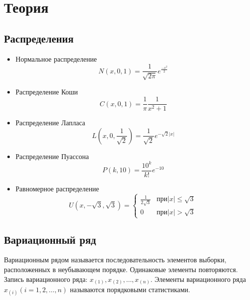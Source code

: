 \documentclass[a4paper]{article}
\begin{document}
\section {Теория}
\subsection{Распределения}
	\begin{itemize}
		\item Нормальное распределение \begin{equation}
										  N(x, 0, 1) = \frac{1}{\sqrt{2\pi}}e^{\frac{-x^2}{2}} \label{norm} 
									   \end{equation}
		\item Распределение Коши \begin{equation}
									C(x, 0, 1) = \frac{1}{\pi}\frac{1}{x^2+1} \label{koshi}
								 \end{equation} 
		\item Распределение Лапласа \begin{equation}
									   L(x, 0, \frac{1}{\sqrt{2}}) = \frac{1}{\sqrt{2}}e^{-\sqrt{2}|x|} \label{laplace} 
									\end{equation}
		\item Распределение Пуассона \begin{equation}
										P(k, 10) = \frac{10^k}{k!}e^{-10}\label{puasson}
									 \end{equation}
		\item Равномерное распределение \begin{equation}
				U(x, -\sqrt{3}, \sqrt{3}) =
				\begin{cases}
					\frac{1}{2\sqrt{3}} &\text{$при |x|\leq \sqrt{3}$}\\
					0 &\text{$при |x|>\sqrt{3}$}
				\end{cases}
				\label{uni} 
			\end{equation}
	\end{itemize}

\subsection{Вариационный ряд}
	\noindent Вариационным рядом называется последовательность элементов выборки, расположенных в неубывающем порядке. Одинаковые элементы повторяются.
	Запись вариационного ряда: $x_{(1)}, x_{(2)}, \ldots, x_{(n)}$.
	Элементы вариационного ряда $x_{(i)} (i = 1, 2, \ldots, n)$ называются порядковыми статистиками.
	
\end{document}
